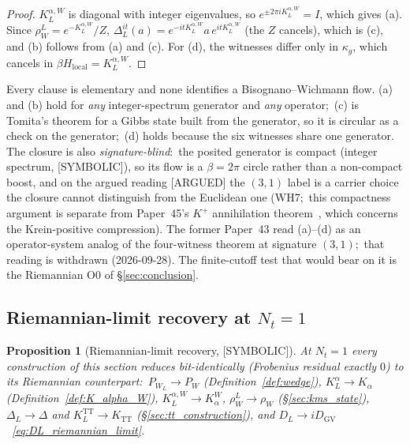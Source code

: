 \documentclass[11pt,a4paper]{article}
\theoremstyle{plain}
\newtheorem{proposition}[theorem]{Proposition}
\theoremstyle{definition}
\newcommand{\TT}{\mathrm{TT}}
\newcommand{\Nt}{N_t}
\newcommand{\DGV}{D_{\mathrm{GV}}}
\newcommand{\DL}{D_{L}}
\newcommand{\KL}{K_{L}}
\begin{document}
\begin{proof}
$\KL^{\alpha, W}$ is diagonal with integer eigenvalues, so
$e^{\pm 2\pi i\KL^{\alpha, W}} = I$, which gives (a).  Since
$\rho_W^L = e^{-\KL^{\alpha, W}}/Z$, $\Delta_L^{it}(a) =
e^{-it\KL^{\alpha, W}} a\, e^{it\KL^{\alpha, W}}$ (the $Z$ cancels),
which is (c), and (b) follows from (a) and (c).  For (d), the witnesses
differ only in $\kappa_g$, which cancels in
$\beta H_{\mathrm{local}} = \KL^{\alpha, W}$.
\end{proof}

Every clause is elementary and none identifies a Bisognano--Wichmann
flow.  (a) and (b) hold for \emph{any} integer-spectrum generator and
\emph{any} operator;\ (c) is Tomita's theorem for a Gibbs state built
from the generator, so it is circular as a check on the generator;\ (d)
holds because the six witnesses share one generator.  The closure is
also \emph{signature-blind}:\ the posited generator is
compact (integer spectrum, [SYMBOLIC]), so its flow is a $\beta = 2\pi$
circle rather than a non-compact boost, and on the argued reading
[ARGUED] the $(3, 1)$ label is a carrier choice the closure cannot
distinguish from the Euclidean one (WH7;\ this compactness argument is
separate from Paper~45's $K^+$ annihilation theorem~\cite{paper45},
which concerns the Krein-positive compression).  The former Paper~43 read (a)--(d)
as an operator-system analog of the four-witness theorem at signature
$(3, 1)$;\ that reading is withdrawn (2026-09-28).  The finite-cutoff
test that would bear on it is the Riemannian O0 of \S\ref{sec:conclusion}.

\subsection{Riemannian-limit recovery at $\Nt = 1$}
\label{sec:riemannian_limit_identification}

\begin{proposition}[Riemannian-limit recovery, {[SYMBOLIC]}]
\label{prop:riemannian_limit_l2}
At $\Nt = 1$ every construction of this section reduces bit-identically
(Frobenius residual exactly $0$) to its Riemannian counterpart:\
$P_{W_L} \to P_W$ (Definition~\ref{def:wedge}),
$\KL^\alpha \to K_\alpha$ (Definition~\ref{def:K_alpha_W}),
$\KL^{\alpha, W} \to K_\alpha^W$, $\rho_W^L \to \rho_W$
(\S\ref{sec:kms_state}), $\Delta_L \to \Delta$ and
$\KL^{\TT} \to K_{\TT}$ (\S\ref{sec:tt_construction}), and
$\DL \to i\DGV$~\eqref{eq:DL_riemannian_limit}.
\end{proposition}
\end{document}
